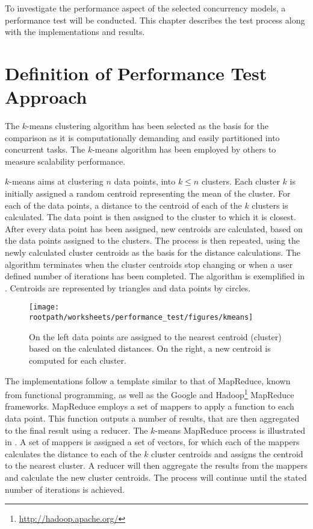\makeatletter {}\makeatother
{}
%
To investigate the performance aspect of the selected concurrency models, a performance test will be conducted.  This chapter describes the test process along with the implementations and results. 
\label{chap:performance}
\section{Definition of Performance Test Approach}
\label{sec:test_approach}
The $k$-means clustering algorithm has been selected as the basis for the comparison as it is computationally demanding and easily partitioned into concurrent tasks\cite[p. 128]{epstein2011towards}. The $k$-means algorithm has been employed by others to measure scalability performance\cite{epstein2011towards}\cite{tardieu2014x10}.

$k$-means aims at clustering $n$ data points, into $k \leq n$ clusters\cite[p. 451]{dataminingconceptsandtechniques}\cite[p. 128]{epstein2011towards}. Each cluster $k$ is initially assigned a random centroid representing the mean of the cluster. For each of the data points, a distance to the centroid of each of the $k$ clusters is calculated. The data point is then assigned to the cluster to which it is closest. After every data point has been assigned, new centroids are calculated, based on the data points assigned to the clusters. The process is then repeated, using the newly calculated cluster centroids as the basis for the distance calculations. The algorithm terminates when the cluster centroids stop changing or when a user defined number of iterations has been completed\cite[p. 128]{epstein2011towards}. The algorithm is exemplified in . Centroids are represented by triangles and data points by circles.

\begin{figure}[ht!]
\centering
\texttt{[image: \\rootpath/worksheets/performance\_test/figures/kmeans]}
\caption{On the left data points are assigned to the nearest centroid (cluster) based on the calculated distances. On the right, a new centroid is computed for each cluster.}\label{fig:kmeans}
\end{figure}

The implementations follow a template similar to that of MapReduce\cite{dean2008mapreduce}, known from functional programming, as well as the Google\cite{dean2008mapreduce} and Hadoop\footnote{\url{http://hadoop.apache.org/}} MapReduce frameworks. MapReduce employs a set of mappers to apply a function to each data point. This function outputs a number of results, that are then aggregated to the final result using a reducer. The $k$-means MapReduce process is illustrated in . A set of mappers is assigned a set of vectors, for which each of the mappers calculates the distance to each of the $k$ cluster centroids and assigns the centroid to the nearest cluster. A reducer will then aggregate the results from the mappers and calculate the new cluster centroids. The process will continue until the stated number of iterations is achieved.

